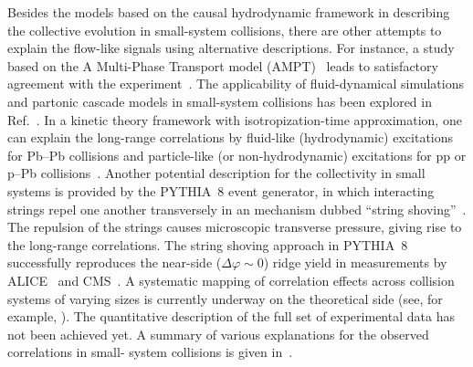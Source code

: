 Besides the models based on the causal hydrodynamic framework in describing the collective evolution in small-system collisions, there are other attempts to explain the flow-like signals using alternative descriptions. For instance, a study based on the A Multi-Phase Transport model (AMPT)~\cite{Lin:2004en} leads to satisfactory agreement with the experiment~\cite{OrjuelaKoop:2015jss}. The applicability of fluid-dynamical simulations and partonic cascade models in small-system collisions has been explored in Ref.~\cite{Gallmeister:2018mcn}. In a kinetic theory framework with isotropization-time approximation, one can explain the long-range correlations by fluid-like (hydrodynamic) excitations for Pb--Pb collisions and particle-like (or non-hydrodynamic) excitations for pp or p--Pb collisions~\cite{Kurkela:2019kip,Kurkela:2020wwb,Ambrus:2021fej}. Another potential description for the collectivity in small systems is provided by the PYTHIA~8 event generator, in which interacting strings repel one another transversely in an mechanism dubbed ``string shoving''~\cite{Bierlich:2017vhg,Bierlich:2019ixq}. The repulsion of the strings causes microscopic transverse pressure, giving rise to the long-range correlations. The string shoving approach in PYTHIA~8 successfully reproduces the near-side ($\Delta\varphi\sim0$) ridge yield in measurements by ALICE~\cite{ALICE:2021nir} and CMS~\cite{Khachatryan:2016txc}. A systematic mapping of correlation effects across collision systems of varying sizes is currently underway on the theoretical side (see, for example, \cite{Schenke:2020mbo}). The quantitative description of the full set of experimental data has not been achieved yet. A summary of various explanations for the observed correlations in small- system collisions is given in~\cite{Strickland:2018exs,Loizides:2016tew,Nagle:2018nvi}. 


